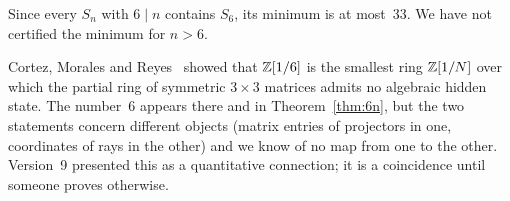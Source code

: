 Since every $S_n$ with $6\mid n$ contains $S_6$, its minimum is at most~33.  We have not
certified the minimum for $n>6$.

\begin{remark}
Cortez, Morales and Reyes~\cite{CortezMoralesReyes2022} showed that $\mathbb{Z}[1/6]$ is the smallest
ring $\mathbb{Z}[1/N]$ over which the partial ring of symmetric $3\times3$ matrices admits no algebraic
hidden state.  The number~6 appears there
and in Theorem~\ref{thm:6n}, but the two statements concern different objects (matrix entries of
projectors in one, coordinates of rays in the other) and we know of no map from one to the
other.  Version~9 presented this as a quantitative connection; it is a coincidence until someone
proves otherwise.
\end{remark}
